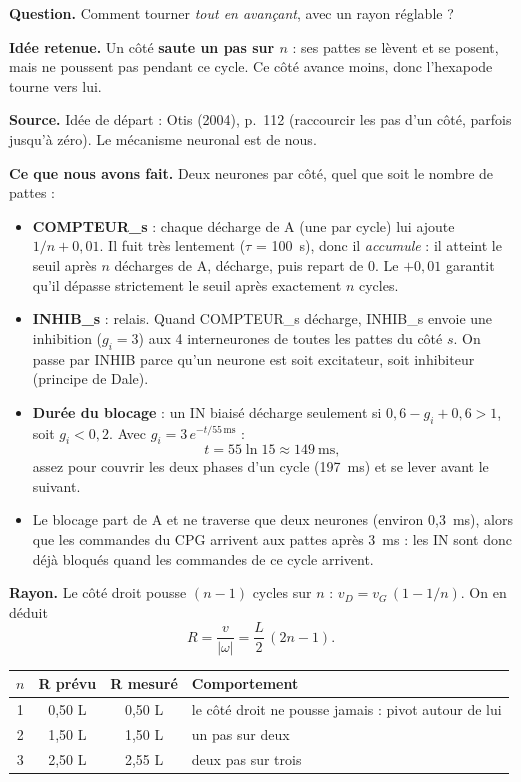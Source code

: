 \documentclass[11pt]{article}
\newcommand{\champ}[2]{\par\noindent\textbf{\color{bleu}#1} #2\par}
\begin{document}
\champ{Question.}{Comment tourner \emph{tout en avançant}, avec un rayon réglable ?}
\champ{Idée retenue.}{Un côté \textbf{saute un pas sur $n$} : ses pattes se lèvent et se posent,
mais ne poussent pas pendant ce cycle. Ce côté avance moins, donc l'hexapode tourne vers lui.}
\champ{Source.}{Idée de départ : Otis (2004), p.~112 \cite{otis2004} (raccourcir les pas d'un côté,
parfois jusqu'à zéro). Le mécanisme neuronal est de nous.}
\champ{Ce que nous avons fait.}{Deux neurones par côté, quel que soit le nombre de pattes :}
\begin{itemize}
  \item \textbf{COMPTEUR\_s} : chaque décharge de A (une par cycle) lui ajoute $1/n + 0{,}01$. Il
        fuit très lentement ($\tau$ = 100~s), donc il \emph{accumule} : il atteint le seuil après
        $n$ décharges de A, décharge, puis repart de 0. Le $+0{,}01$ garantit qu'il dépasse
        strictement le seuil après exactement $n$ cycles.
  \item \textbf{INHIB\_s} : relais. Quand COMPTEUR\_s décharge, INHIB\_s envoie une inhibition
        ($g_i = 3$) aux 4 interneurones de toutes les pattes du côté $s$. On passe par INHIB parce
        qu'un neurone est soit excitateur, soit inhibiteur (principe de Dale).
  \item \textbf{Durée du blocage} : un IN biaisé décharge seulement si $0{,}6 - g_i + 0{,}6 > 1$,
        soit $g_i < 0{,}2$. Avec $g_i = 3\,e^{-t/55\,\mathrm{ms}}$ :
        \[ t = 55 \ln 15 \approx 149\ \text{ms}, \]
        assez pour couvrir les deux phases d'un cycle (197~ms) et se lever avant le suivant.
  \item Le blocage part de A et ne traverse que deux neurones (environ 0,3~ms), alors que les
        commandes du CPG arrivent aux pattes après 3~ms : les IN sont donc déjà bloqués quand les
        commandes de ce cycle arrivent.
\end{itemize}

\champ{Rayon.}{Le côté droit pousse $(n - 1)$ cycles sur $n$ : $v_D = v_G\,(1 - 1/n)$. On en déduit
\[ R = \frac{v}{|\omega|} = \frac{L}{2}\,(2n - 1) . \]}

\begin{center}
\small
\begin{tabular}{cccl}
  \toprule
  $n$ & \textbf{R prévu} & \textbf{R mesuré} & \textbf{Comportement}\\ \midrule
  1 & 0,50 L & 0,50 L & le côté droit ne pousse jamais : pivot autour de lui\\
  2 & 1,50 L & 1,50 L & un pas sur deux\\
  3 & 2,50 L & 2,55 L & deux pas sur trois\\ \bottomrule
\end{tabular}
\end{center}
\end{document}
